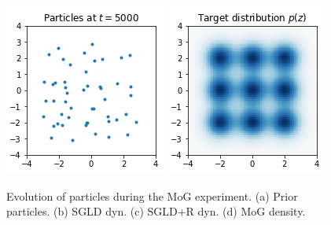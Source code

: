 \begin{figure}[ht]
\begin{center}
\endminipage\hfill
{}
  \includegraphics[width=\linewidth]{img/psvgd.png}
\endminipage\hfill
{}
  \includegraphics[width=\linewidth]{img/target.png}\label{fig:3x3gauss}
\endminipage
\end{center}
\caption{Evolution of  particles during the MoG experiment. (a) Prior particles. (b) SGLD dyn. (c) SGLD+R dyn. (d) MoG density.}\label{fig:mog}
\end{figure}


